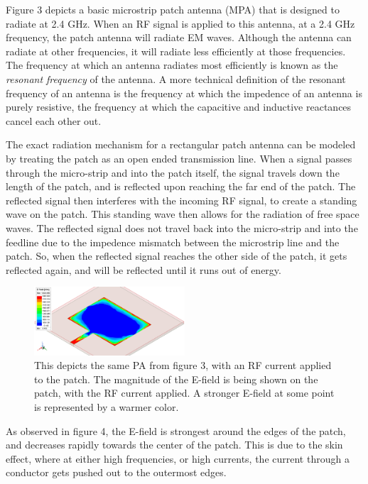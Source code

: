 \documentclass[12pt]{article}
\begin{document}
Figure 3 depicts a basic microstrip patch antenna (MPA) that is designed to radiate at 2.4 GHz. When an RF signal is applied to this antenna, at a 2.4 GHz frequency, the patch antenna will radiate EM waves. Although the antenna can radiate at other frequencies, it will radiate less efficiently at those frequencies. The frequency at which an antenna radiates most efficiently is known as the \textit{resonant frequency} of the antenna. A more technical definition of the resonant frequency of an antenna is the frequency at which the impedence of an antenna is purely resistive, the frequency at which the capacitive and inductive reactances cancel each other out. 

The exact radiation mechanism for a rectangular patch antenna can be modeled by treating the patch as an open ended transmission line. When a signal passes through the micro-strip and into the patch itself, the signal travels down the length of the patch, and is reflected upon reaching the far end of the patch. The reflected signal then interferes with the incoming RF signal, to create a standing wave on the patch. This standing wave then allows for the radiation of free space waves. The reflected signal does not travel back into the micro-strip and into the feedline due to the impedence mismatch between the microstrip line and the patch. So, when the reflected signal reaches the other side of the patch, it gets reflected again, and will be reflected until it runs out of energy.   

\begin{figure}[h]
    \centering
    \includegraphics[width=0.5\textwidth]{basic-patch-antenna-MagE-on-patch.png}
    \caption{This depicts the same PA from figure 3, with an RF current applied to the patch. The magnitude of the E-field is being shown on the patch, with the RF current applied. A stronger E-field at some point is represented by a warmer color.}
\end{figure}

As observed in figure 4, the E-field is strongest around the edges of the patch, and decreases rapidly towards the center of the patch. This is due to the skin effect, where at either high frequencies, or high currents, the current through a conductor gets pushed out to the outermost edges. 
\end{document}
